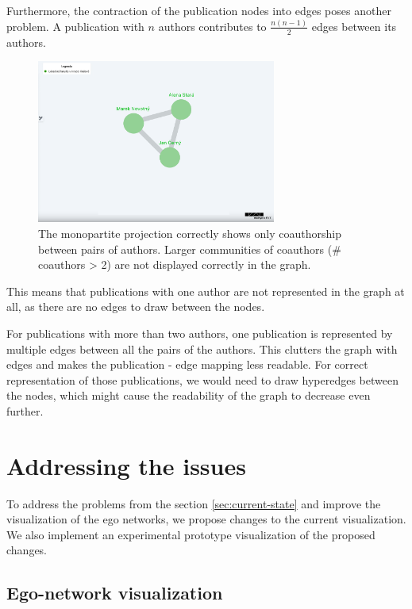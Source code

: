 Furthermore, the contraction of the publication nodes into edges poses another problem.
A publication with $n$ authors contributes to $\frac{n(n-1)}{2}$ edges between its authors. 

\begin{figure}[ht!]
    \captionsetup{width=.9\linewidth}
    \includegraphics[width=0.7\textwidth]{../img/contraction.png}
    \centering
    \caption{The monopartite projection correctly shows only coauthorship between pairs of authors. Larger communities of coauthors (\# coauthors > 2) are not displayed correctly in the graph.}
\end{figure}

This means that publications with one author are not represented in the graph at all, as there are no edges to draw between the nodes.

For publications with more than two authors, one publication is represented by multiple edges between all the pairs of the authors.
This clutters the graph with edges and makes the publication - edge mapping less readable. 
For correct representation of those publications, we would need to draw hyperedges between the nodes, which might cause the readability of the graph to decrease even further.

\section{Addressing the issues}\label{sec:addressing-issues}

To address the problems from the section \ref{sec:current-state} and improve the visualization of the ego networks, we propose changes to the current visualization.
We also implement an experimental prototype visualization of the proposed changes.

\subsection{Ego-network visualization}

